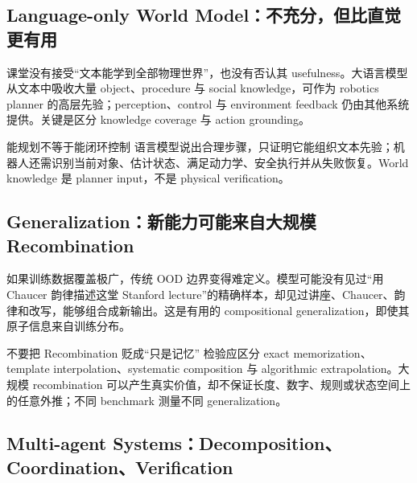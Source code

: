 
\subsection{Language-only World Model：不充分，但比直觉更有用}

课堂没有接受“文本能学到全部物理世界”，也没有否认其 usefulness。大语言模型从文本中吸收大量 object、procedure 与 social knowledge，可作为 robotics planner 的高层先验；perception、control 与 environment feedback 仍由其他系统提供。关键是区分 knowledge coverage 与 action grounding。

\begin{warningbox}{能规划不等于能闭环控制}
语言模型说出合理步骤，只证明它能组织文本先验；机器人还需识别当前对象、估计状态、满足动力学、安全执行并从失败恢复。World knowledge 是 planner input，不是 physical verification。
\end{warningbox}


\subsection{Generalization：新能力可能来自大规模 Recombination}

如果训练数据覆盖极广，传统 OOD 边界变得难定义。模型可能没有见过“用 Chaucer 韵律描述这堂 Stanford lecture”的精确样本，却见过讲座、Chaucer、韵律和改写，能够组合成新输出。这是有用的 compositional generalization，即使其原子信息来自训练分布。

\begin{knowledgebox}{不要把 Recombination 贬成“只是记忆”}
检验应区分 exact memorization、template interpolation、systematic composition 与 algorithmic extrapolation。大规模 recombination 可以产生真实价值，却不保证长度、数字、规则或状态空间上的任意外推；不同 benchmark 测量不同 generalization。
\end{knowledgebox}

\subsection{Multi-agent Systems：Decomposition、Coordination、Verification}

